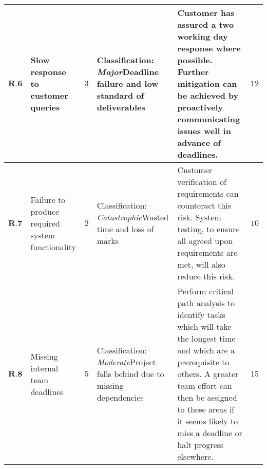 \begin{longtable}[H]{| p{0.6cm} | p{2cm} | p{0.3cm} | p{2.6cm} | p{8.1cm} | p{0.7cm} |}
   $  \textbf{R.6}   $ & Slow response to customer queries                & $3$       & Classification: \newline\textit{Major}\newline Deadline failure and  low standard of deliverables         
    & Customer has assured a two working day response where possible. Further mitigation can be achieved by proactively communicating issues well in advance of deadlines.                                                                                                                                                                                                                                                                                                                                                                            
    & $12$    \\ \hline
   $ \textbf{R.7} $    & Failure to produce required system functionality & $2$ & Classification: \newline\textit{Catastrophic}\newline Wasted time and loss of marks                        
    & Customer verification of requirements can counteract this risk. System testing, to ensure all agreed upon requirements are met, will also reduce this risk.                                                                                                                                                                                                                                                                                                                                                                                      
    & $10$   \\ \hline
   $ \textbf{R.8}  $   & Missing internal team deadlines                  & $5$           & Classification: \newline\textit{Moderate}\newline Project falls behind due to missing dependencies                     
    & Perform critical path analysis to identify tasks which will take the longest time and which are a prerequisite to others. A greater team effort can then be assigned to these areas if it seems likely to miss a deadline or halt progress elsewhere.                                           
    &  $15$    \\ \hline
\end{longtable}
